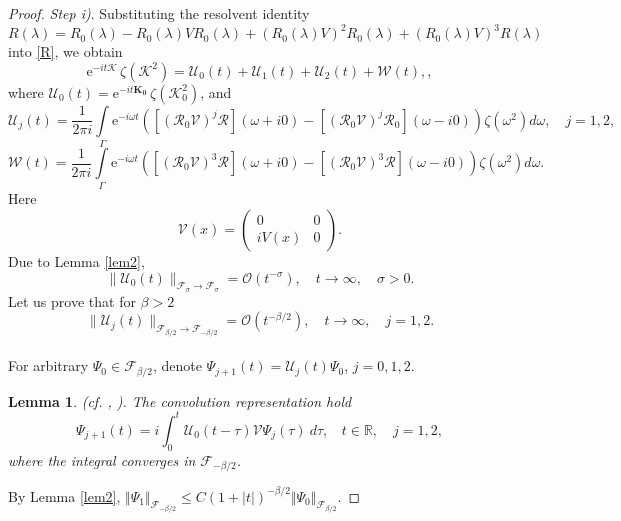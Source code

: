 \documentclass[10pt,a4paper]{amsart}
\newtheorem{lemma}{Lemma}
\newcommand{\E}{\mathrm{e}}
\newcommand{\R}{{\mathbb R}}
\newcommand{\cF}{{\mathcal F}}
\newcommand{\cK}{{\mathcal K}}
\newcommand{\cR}{{\mathcal R}}
\newcommand{\cU}{{\mathcal U}}
\begin{document}
\begin{proof}
{\it Step i)}.
Substituting the  resolvent identity 
$$
R(\lambda)= R_0(\lambda)- R_0(\lambda)V R_0(\lambda)+ (R_0(\lambda)V)^2 R_0(\lambda) + (R_0(\lambda)V)^3 R(\lambda)
$$ 
into \eqref{R}, we obtain
\[
\E^{-it\cK}\,\zeta(\cK^2)=\cU_0(t)+\cU_1(t)+\cU_2(t)+{\mathcal W}(t),,
\]
where $\cU_0(t)=\E^{-it\mathbf{K_0}}\,\zeta(\cK_0^2)$, and
\begin{equation*}
\cU_j(t)=\frac 1{2\pi i}\int\limits_{\Gamma}\! \E^{-i\omega t}
([(\cR_0{\mathcal V})^j\cR](\omega+i0)-[(\cR_0{\mathcal V})^j\cR_0](\omega-i0))\zeta(\omega^2) d\omega, \quad j=1,2,
\end{equation*}
\begin{equation*}
{\mathcal W}(t)=\frac 1{2\pi i}\int\limits_{\Gamma}\! \E^{-i\omega t}
([(\cR_0{\mathcal V})^3\cR](\omega+i0)-[(\cR_0{\mathcal V})^3\cR](\omega-i0))\zeta(\omega^2) d\omega.
\end{equation*}
Here
\begin{equation}\label{cV}
{\mathcal V}(x)=\left(\begin{array}{cc}
  0               &   0
  \\
  iV(x)   &   0
  \end{array}\right).
\end{equation}
Due to Lemma \ref{lem2}, 
\begin{equation}\label{U0}
\big\| \cU_0(t)\big\|_{{\mathcal F}_{\sigma}\to {\mathcal F}_{\sigma}}
={\mathcal O}(t^{-\sigma}),\quad t\to \infty,\quad \sigma>0.
\end{equation}
Let us prove that for $\beta>2$ %
\begin{equation}\label{U1}
\big\| \cU_j(t)\big\|_{{\mathcal F}_{\beta/2}\to {\mathcal F}_{-\beta/2}}
={\mathcal O}(t^{-\beta/2}),\quad t\to \infty,\quad j=1,2.
\end{equation}
\smallskip\\
For arbitrary  $\Psi_0\in {\mathcal F}_{\beta/2}$, denote  $\Psi_{j+1}(t)=\cU_j(t)\Psi_0$, $j=0,1,2$.
\begin{lemma}(cf. \cite[Lemma 3.8]{KK10}, \cite[Lemma 36.6]{KK12}). 
The convolution representation hold
\begin{equation}\label{conv}
\Psi_{j+1}(t)=
 i\int_0^t \cU_0(t-\tau){\mathcal V} \Psi_j(\tau)~d\tau,~~~~t\in\R,\quad j=1,2,
\end{equation}
where the integral converges in ${\mathcal F}_{-\beta/2}$.
\end{lemma}
By Lemma \ref{lem2},
$\Vert\Psi_1\Vert_{\cF_{-\beta/2}}\le C (1+|t|)^{-\beta/2}\Vert \Psi_0\Vert_{\cF_{\beta/2}}$.

\end{proof}
\end{document}
